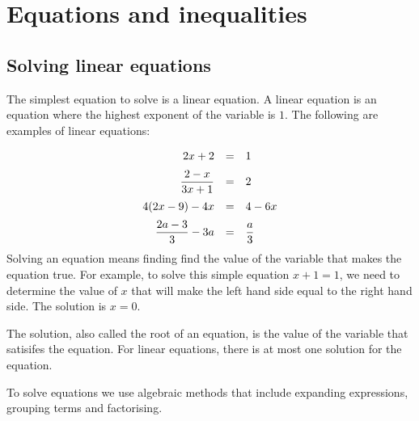\chapter{Equations and inequalities}
\setcounter{figure}{1}
\setcounter{subfigure}{1}

\section{Solving linear equations}
\nopagebreak
           
The simplest equation to solve is a linear equation. A linear equation is an
equation where the highest exponent of the variable is $1$. The
following are examples of linear equations:\par 


\begin{equation*}
\begin{array}{ccl}\hfill 2x+2& =& 1\hfill \vspace{6pt} \\
 \hfill \dfrac{2-x}{3x+1}& =& 2\hfill \vspace{6pt} \\
\hfill 4(2x-9)-4x&=&4-6x \hfill  \vspace{6pt}\\ 
\hfill \dfrac{2a-3}{3}-3a&=&\dfrac{a}{3} \hfill\\
\end{array}
\end{equation*}
Solving an equation means finding find the value of the variable that makes
the equation true. For example, to solve this simple equation $x+1=1$, we need to determine the value of $x$ that will make the left hand side equal to the right hand side. The solution is $x=0$.\par 
The solution, also called the root of an equation, is the value of the variable that satisifes the equation.
For linear equations, there is at most one solution for the equation.\par 
To solve equations we use algebraic methods that include expanding expressions, grouping terms and factorising.\par 

